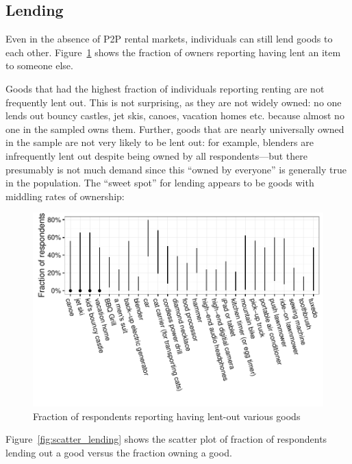 \documentclass[11pt]{article}
\begin{document}


\subsection{Lending} 
Even in the absence of P2P rental markets, individuals can still lend goods to each other. 
Figure~\ref{fig:lending} shows the fraction of owners reporting having lent an item to someone else.  

Goods that had the highest fraction of individuals reporting renting are not frequently lent out. 
This is not surprising, as they are not widely owned: 
no one lends out bouncy castles, jet skis, canoes, vacation homes etc. because almost no one in the sampled owns them. 
Further, goods that are nearly universally owned in the sample are not very likely to be lent out: 
for example, blenders are infrequently lent out despite being owned by all respondents---but there presumably is not much demand since this ``owned by everyone'' is generally true in the population. 
The ``sweet spot'' for lending appears to be goods with middling rates of ownership:  


\begin{figure}
\centering 
\caption{Fraction of respondents reporting having lent-out various goods \label{fig:lending}}
\begin{minipage}{0.90 \linewidth}
\includegraphics[width = \linewidth]{./plots/lent_fractions.pdf} 
\end{minipage} 
\end{figure} 

Figure~\ref{fig:scatter_lending} shows the scatter plot of fraction of respondents lending out a good versus the fraction owning a good. 
\end{document}
